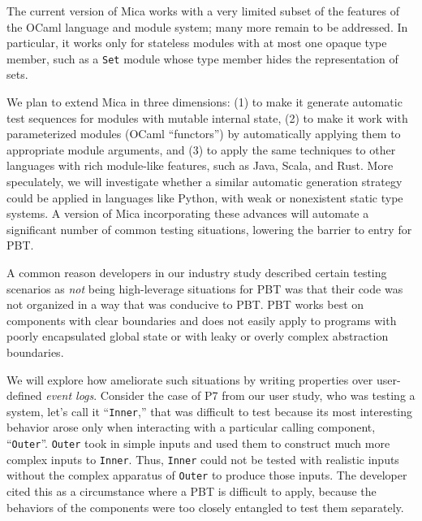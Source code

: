 The current version of Mica works with a very limited subset of
the features of the OCaml language and
module system; many more remain to be addressed. In particular, it
works only for stateless modules with at most one opaque type
member, such as a {\tt Set} module whose type member hides the
representation of sets.

We plan to extend Mica in three dimensions: (1) to make it generate automatic
test sequences for modules with mutable internal state, (2) to
make it work with parameterized modules (OCaml ``functors'') by
automatically applying them to appropriate module arguments, and (3)
to apply the same techniques to other languages with rich module-like
features, such as Java, Scala, and Rust.  More speculately, we will
investigate whether a similar automatic generation strategy could be
applied in languages like Python, with weak or nonexistent static type
systems.
%
A version of Mica incorporating these advances will automate a
significant number of common testing situations, lowering the barrier
to entry for PBT.


%
\iflater{}\fi
A common reason developers in our industry study described certain
testing scenarios as {\em not} being high-leverage situations for PBT was that
their code was not organized in a way that was conducive to
PBT.  PBT works best on components with clear boundaries and does not
easily apply to programs with
poorly encapsulated global state or with leaky or overly complex abstraction
boundaries.

We will explore
how ameliorate such situations by writing properties over user-defined
{\em event logs}. Consider
the case of P7\iflater{}\fi{} from our user
study, who was testing
a system, let's call it ``\lstinline{Inner},'' that  was difficult to
test because
its most interesting behavior arose only when interacting with a particular calling
component, ``\lstinline{Outer}''.
\lstinline{Outer} took in simple inputs and used them to construct
much more complex inputs to \lstinline{Inner}. Thus, \lstinline{Inner}
could not be tested with
realistic inputs without the complex apparatus of \lstinline{Outer} to
produce those inputs.  The developer cited this as a circumstance where a
PBT is difficult to apply, because the behaviors of the components were too
closely entangled to test them separately.

